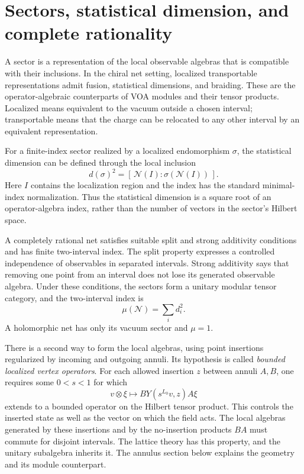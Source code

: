 \section{Sectors, statistical dimension, and complete rationality}

A sector is a representation of the local observable algebras that
is compatible with their inclusions. In the chiral net setting,
localized transportable representations admit fusion, statistical
dimensions, and braiding. These are the operator-algebraic
counterparts of VOA modules and their tensor products.
Localized means equivalent to the vacuum outside a chosen interval;
transportable means that the charge can be relocated to any other
interval by an equivalent representation.

For a finite-index sector realized by a localized endomorphism
$\sigma$, the statistical dimension can be defined through
the local inclusion
\[
 d(\sigma)^2=
 [\,\mathcal N(I):\sigma(\mathcal N(I))\,].
\]
Here $I$ contains the localization region and the index has
the standard minimal-index normalization. Thus the statistical
dimension is a square root of an operator-algebra index, rather
than the number of vectors in the sector's Hilbert space.

A completely rational net satisfies suitable split and strong
additivity conditions and has finite two-interval index. The split
property expresses a controlled independence of observables in
separated intervals. Strong additivity says that removing one point
from an interval does not lose its generated observable algebra.
Under these conditions, the sectors form a unitary modular tensor
category, and the two-interval index is
\[
 \mu(\mathcal N)=\sum_i d_i^2.
\]
A holomorphic net has only its vacuum sector and $\mu=1$.

There is a second way to form the local algebras, using point
insertions regularized by incoming and outgoing annuli.
Its hypothesis is called \emph{bounded localized vertex operators}.
For each allowed insertion $z$ between annuli $A,B$, one requires
some $0<s<1$ for which
\[
 v\otimes\xi\longmapsto BY(s^{L_0}v,z)A\xi
\]
extends to a bounded operator on the Hilbert tensor product.
This controls the inserted state as well as the vector on which
the field acts. The local algebras generated by these insertions
and by the no-insertion products $BA$ must commute for disjoint
intervals. The lattice theory has this property, and the unitary
subalgebra inherits it. The annulus section below explains the
geometry and its module counterpart.

